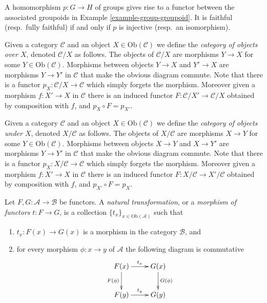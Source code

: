 \begin{example}
\label{example-group-homorphism-functor}
A homomorphism $p\colon G\to H$ of groups gives rise to a functor
between the associated groupoids in Example \ref{example-group-groupoid}. It is
faithful (resp.\ fully faithful) if and only if $p$ is injective (resp.\ an
isomorphism).
\end{example}

\begin{example}
\label{example-category-over-X}
Given a category $\mathcal{C}$ and an object $X\in \text{Ob}(\mathcal{C})$
we define the {\it category of objects over $X$},
denoted $\mathcal{C}/X$ as follows.
The objects of $\mathcal{C}/X$ are morphisms $Y\to X$ for
some $Y\in \text{Ob}(\mathcal{C})$. Morphisms between objects
$Y\to X$ and $Y'\to X$ are morphisms $Y\to Y'$ in $\mathcal{C}$ that
make the obvious diagram commute.  Note that there is a functor
$p_X\colon \mathcal{C}/X\to \mathcal{C}$ which simply forgets the
morphism.  Moreover given a morphism $f\colon X'\to X$ in
$\mathcal{C}$ there is an induced functor 
$F\colon \mathcal{C}/X' \to \mathcal{C}/X$ obtained by composition with $f$,
and $p_X\circ F = p_{X'}$.
\end{example}

\begin{example}
\label{example-category-under-X}
Given a category $\mathcal{C}$ and an object $X\in \text{Ob}(\mathcal{C})$
we define the {\it category of objects under $X$},
denoted $X/\mathcal{C}$ as follows.
The objects of $X/\mathcal{C}$ are morphisms $X\to Y$ for
some $Y\in \text{Ob}(\mathcal{C})$. Morphisms between objects
$X\to Y$ and $X\to Y'$ are morphisms $Y\to Y'$ in $\mathcal{C}$ that
make the obvious diagram commute.  Note that there is a functor
$p_X\colon X/\mathcal{C}\to \mathcal{C}$ which simply forgets the
morphism.  Moreover given a morphism $f\colon X'\to X$ in
$\mathcal{C}$ there is an induced functor 
$F\colon X/\mathcal{C} \to X'/\mathcal{C}$
obtained by composition with $f$,
and $p_{X'}\circ F = p_X$.
\end{example}




\begin{definition}
\label{definition-transformation-functors}
Let $F, G : \mathcal{A} \to \mathcal{B}$ be functors.
A {\it natural transformation}, or a {\it morphism of functors}
$t : F \to G$, is a collection $\{t_x\}_{x\in \text{Ob}(\mathcal{A})}$
such that
\begin{enumerate}
\item $t_x : F(x) \to G(x)$ is a morphism in the category $\mathcal{B}$, and
\item for every morphism $\phi : x \to y$ of $\mathcal{A}$ the following
diagram is commutative
$$
\xymatrix{
F(x) \ar[r]^{t_x} \ar[d]_{F(\phi)} & G(x) \ar[d]^{G(\phi)} \\
F(y) \ar[r]^{t_y} & G(y) }
$$
\end{enumerate}
\end{definition}

